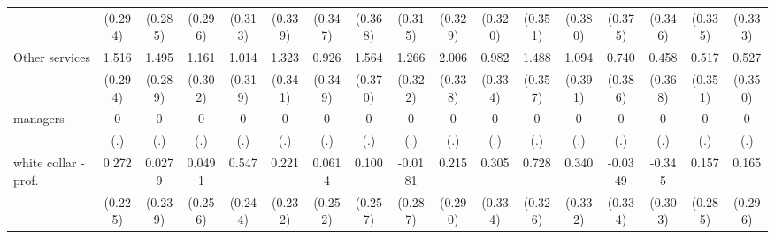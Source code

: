{\begin{tabular}{l*{16}{c}}
                    &     (0.294)         &     (0.285)         &     (0.296)         &     (0.313)         &     (0.339)         &     (0.347)         &     (0.368)         &     (0.315)         &     (0.329)         &     (0.320)         &     (0.351)         &     (0.380)         &     (0.375)         &     (0.346)         &     (0.335)         &     (0.333)         \\
[1em]
Other services      &       1.516\sym{***}&       1.495\sym{***}&       1.161\sym{***}&       1.014\sym{**} &       1.323\sym{***}&       0.926\sym{**} &       1.564\sym{***}&       1.266\sym{***}&       2.006\sym{***}&       0.982\sym{**} &       1.488\sym{***}&       1.094\sym{**} &       0.740         &       0.458         &       0.517         &       0.527         \\
                    &     (0.294)         &     (0.289)         &     (0.302)         &     (0.319)         &     (0.341)         &     (0.349)         &     (0.370)         &     (0.322)         &     (0.338)         &     (0.334)         &     (0.357)         &     (0.391)         &     (0.386)         &     (0.368)         &     (0.351)         &     (0.350)         \\
[1em]
managers            &           0         &           0         &           0         &           0         &           0         &           0         &           0         &           0         &           0         &           0         &           0         &           0         &           0         &           0         &           0         &           0         \\
                    &         (.)         &         (.)         &         (.)         &         (.)         &         (.)         &         (.)         &         (.)         &         (.)         &         (.)         &         (.)         &         (.)         &         (.)         &         (.)         &         (.)         &         (.)         &         (.)         \\
[1em]
white collar - prof.&       0.272         &      0.0279         &      0.0491         &       0.547\sym{*}  &       0.221         &      0.0614         &       0.100         &     -0.0181         &       0.215         &       0.305         &       0.728\sym{*}  &       0.340         &     -0.0349         &      -0.345         &       0.157         &       0.165         \\
                    &     (0.225)         &     (0.239)         &     (0.256)         &     (0.244)         &     (0.232)         &     (0.252)         &     (0.257)         &     (0.287)         &     (0.290)         &     (0.334)         &     (0.326)         &     (0.332)         &     (0.334)         &     (0.303)         &     (0.285)         &     (0.296)         \\

\end{tabular}}
